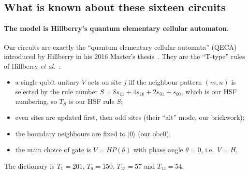 \subsection{What is known about these sixteen circuits}
\label{sec:lit-known}
\paragraph{The model is Hillberry's quantum elementary cellular automaton.} Our circuits are exactly the ``quantum
elementary cellular automata'' (QECA) introduced by Hillberry in his 2016 Master's thesis~\cite{hillberry2016}. They are
the ``T-type'' rules of Hillberry \emph{et al.}~\cite{hillberry2021}:
\begin{itemize}
\item a single-qubit unitary $V$ acts on site $j$ iff the neighbour pattern $(m,n)$ is selected by the rule number
  $S=8s_{11}+4s_{10}+2s_{01}+s_{00}$, which is our HSF numbering, so $T_S$ is our HSF rule $S$;
\item even sites are updated first, then odd sites (their ``alt'' mode, our brickwork);
\item the boundary neighbours are fixed to $|0\rangle$ (our obc0);
\item the main choice of gate is $V=HP(\theta)$ with phase angle $\theta=0$, i.e.\ $V=H$.
\end{itemize}
The dictionary is $T_1=201$, $T_6=150$, $T_{13}=57$ and $T_{14}=54$.

